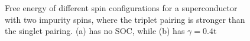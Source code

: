 \begin{figure}[H]
    \centering
    \label{fig:spin_tSC}
    \caption{Free energy of different spin configurations for a superconductor with two impurity spins, where the triplet pairing is stronger than the singlet pairing. (a) has no SOC, while (b) has $\gamma=0.4$t }
\end{figure}



